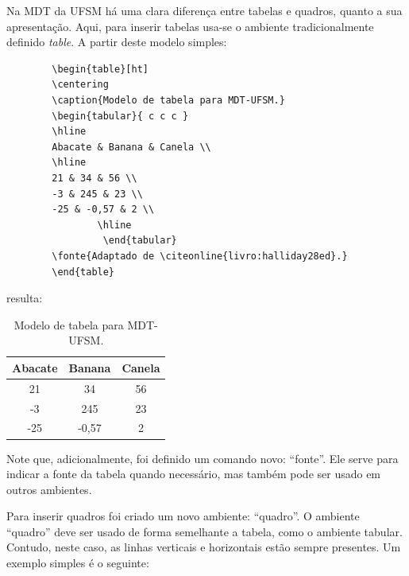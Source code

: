          \par Na MDT da UFSM há uma clara diferença entre tabelas e quadros, quanto a sua apresentação. Aqui, para inserir tabelas usa-se o ambiente tradicionalmente definido \textit{table}. A partir deste modelo simples:
        
         \begin{verbatim}
		\begin{table}[ht]
		\centering
		\caption{Modelo de tabela para MDT-UFSM.}
		\begin{tabular}{ c c c }
		\hline
		Abacate & Banana & Canela \\
		\hline
		21 & 34 & 56 \\
		-3 & 245 & 23 \\
		-25 & -0,57 & 2 \\
                \hline
                 \end{tabular}
		\fonte{Adaptado de \citeonline{livro:halliday28ed}.}
		\end{table}
	  \end{verbatim}
         
         \noindent resulta:
         
         \begin{table}[ht]
         \centering
         \caption{Modelo de tabela para MDT-UFSM.}
         \begin{tabular}{ c c c }
         \hline
         Abacate & Banana & Canela \\
         \hline
         21 & 34 & 56 \\
         -3 & 245 & 23 \\
         -25 & -0,57 & 2 \\
         \hline
         \end{tabular}
         \end{table}
         
         \par Note que, adicionalmente, foi definido um comando novo: ``fonte''. Ele serve para indicar a fonte da tabela quando necessário, mas também pode ser usado em outros ambientes.
         
         \par Para inserir quadros foi criado um novo ambiente: ``quadro''. O ambiente ``quadro'' deve ser usado de forma semelhante a tabela, como o ambiente tabular. Contudo, neste caso, as linhas verticais e horizontais estão sempre presentes. Um exemplo simples é o seguinte: 
         
